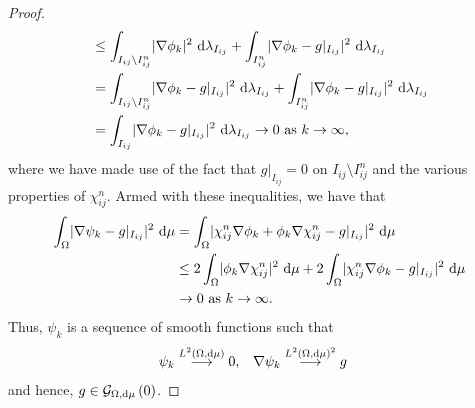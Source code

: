 \begin{proof}
\begin{align*}
		&\leq \int_{I_{ij}\setminus I_{ij}^n}\lvert \nabla\phi_k \rvert^2 \ \mathrm{d}\lambda_{I_{ij}} +  \int_{I_{ij}^n}\lvert \nabla\phi_k - g\vert_{I_{ij}} \rvert^2 \ \mathrm{d}\lambda_{I_{ij}} \\
		&= \int_{I_{ij}\setminus I_{ij}^n}\lvert \nabla\phi_k - g\vert_{I_{ij}} \rvert^2 \ \mathrm{d}\lambda_{I_{ij}} +  \int_{I_{ij}^n}\lvert \nabla\phi_k - g\vert_{I_{ij}} \rvert^2 \ \mathrm{d}\lambda_{I_{ij}} \\
		&= \int_{I_{ij}}\lvert \nabla\phi_k - g\vert_{I_{ij}} \rvert^2 \ \mathrm{d}\lambda_{I_{ij}} \rightarrow0 \ \text{as} \ k \rightarrow\infty,
	\end{align*}
	where we have made use of the fact that $g\vert_{I_{ij}}=0$ on $I_{ij}\setminus I_{ij}^n$ and the various properties of $\chi_{ij}^n$.
	Armed with these inequalities, we have that
	\begin{align*}
		\int_{\Omega}\lvert \nabla\psi_k - g\vert_{I_{ij}} \rvert^2 \ \mathrm{d}\mu &= \int_{\Omega}\lvert \chi_{ij}^n\nabla\phi_k + \phi_k\nabla\chi_{ij}^n - g\vert_{I_{ij}} \rvert^2 \ \mathrm{d}\mu \\
		&\leq 2\int_{\Omega}\lvert \phi_k\nabla\chi_{ij}^n \rvert^2 \ \mathrm{d}\mu + 2\int_{\Omega}\lvert \chi_{ij}^n\nabla\phi_k - g\vert_{I_{ij}} \rvert^2 \ \mathrm{d}\mu \\
		&\rightarrow0 \ \text{as} \ k \rightarrow\infty.
	\end{align*}
	Thus, $\psi_k$ is a sequence of smooth functions such that
	\begin{align*}
		\psi_k \overset{L^{2}\left( \Omega,\mathrm{d}\mu \right)}{\longrightarrow} 0, &\quad
		\nabla\psi_k \overset{L^{2}\left( \Omega,\mathrm{d}\mu \right)^2}{\longrightarrow} g
	\end{align*}
	and hence, $g\in\mathcal{G}_{ \Omega, \mathrm{d}\mu}\left( 0 \right)$.
\end{proof}

